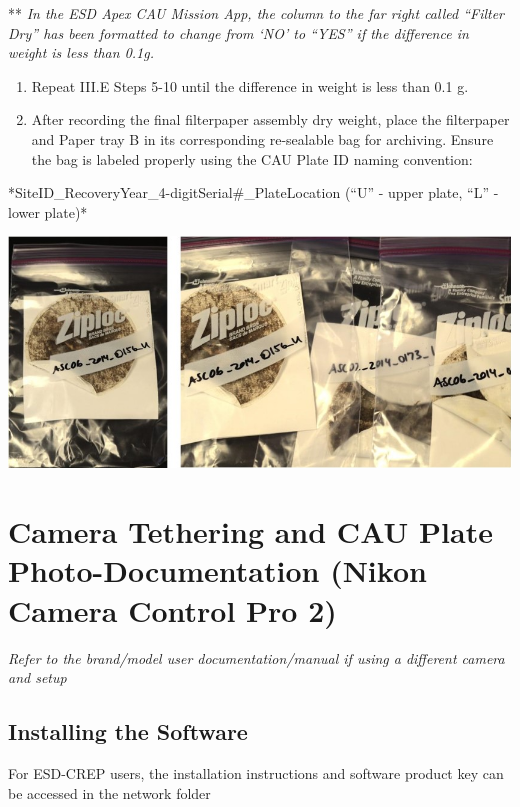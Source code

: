 \documentclass[]{book}
\begin{document}
** \emph{In the ESD Apex CAU Mission App, the column to the far right called ``Filter Dry'' has been formatted to change from `NO' to ``YES'' if the difference in weight is less than 0.1g.}

\begin{enumerate}
\def\labelenumi{\arabic{enumi}.}
\setcounter{enumi}{10}
\item
  Repeat III.E Steps 5-10 until the difference in weight is less than 0.1 g.
\item
  After recording the final filterpaper assembly dry weight, place the filterpaper and Paper tray B in its corresponding re-sealable bag for archiving. Ensure the bag is labeled properly using the CAU Plate ID naming convention:
\end{enumerate}

*SiteID\_RecoveryYear\_4-digitSerial\#\_PlateLocation (``U'' - upper plate, ``L'' - lower plate)*

\includegraphics{images/CAU_bag.jpg}

\hypertarget{camera-tethering-and-cau-plate-photo-documentation-nikon-camera-control-pro-2}{%
\section{Camera Tethering and CAU Plate Photo-Documentation (Nikon Camera Control Pro 2)}\label{camera-tethering-and-cau-plate-photo-documentation-nikon-camera-control-pro-2}}

\emph{Refer to the brand/model user documentation/manual if using a different camera and setup}

\hypertarget{installing-the-software}{%
\subsection{Installing the Software}\label{installing-the-software}}

For ESD-CREP users, the installation instructions and software product key can be accessed in the network folder
\end{document}
